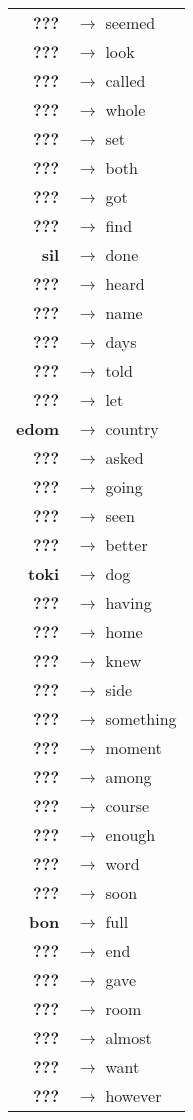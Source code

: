 \begin{tabular}{rl}
\textbf{???} & $\rightarrow$ seemed \\
\textbf{???} & $\rightarrow$ look \\
\textbf{???} & $\rightarrow$ called \\
\textbf{???} & $\rightarrow$ whole \\
\textbf{???} & $\rightarrow$ set \\
\textbf{???} & $\rightarrow$ both \\
\textbf{???} & $\rightarrow$ got \\
\textbf{???} & $\rightarrow$ find \\
\textbf{sil} & $\rightarrow$ done \\
\textbf{???} & $\rightarrow$ heard \\
\textbf{???} & $\rightarrow$ name \\
\textbf{???} & $\rightarrow$ days \\
\textbf{???} & $\rightarrow$ told \\
\textbf{???} & $\rightarrow$ let \\
\textbf{edom} & $\rightarrow$ country \\
\textbf{???} & $\rightarrow$ asked \\
\textbf{???} & $\rightarrow$ going \\
\textbf{???} & $\rightarrow$ seen \\
\textbf{???} & $\rightarrow$ better \\
\textbf{toki} & $\rightarrow$ dog \\
\textbf{???} & $\rightarrow$ having \\
\textbf{???} & $\rightarrow$ home \\
\textbf{???} & $\rightarrow$ knew \\
\textbf{???} & $\rightarrow$ side \\
\textbf{???} & $\rightarrow$ something \\
\textbf{???} & $\rightarrow$ moment \\
\textbf{???} & $\rightarrow$ among \\
\textbf{???} & $\rightarrow$ course \\
\textbf{???} & $\rightarrow$ enough \\
\textbf{???} & $\rightarrow$ word \\
\textbf{???} & $\rightarrow$ soon \\
\textbf{bon} & $\rightarrow$ full \\
\textbf{???} & $\rightarrow$ end \\
\textbf{???} & $\rightarrow$ gave \\
\textbf{???} & $\rightarrow$ room \\
\textbf{???} & $\rightarrow$ almost \\
\textbf{???} & $\rightarrow$ want \\
\textbf{???} & $\rightarrow$ however \\
\end{tabular}


